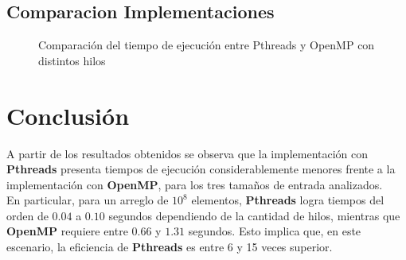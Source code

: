 \documentclass[12pt]{article}
\begin{document}
\subsection*{Comparacion Implementaciones}

\begin{figure}[H]
\centering
{}
\caption{Comparación del tiempo de ejecución entre Pthreads y OpenMP con distintos hilos}
\end{figure}

\section*{Conclusión}
A partir de los resultados obtenidos se observa que la implementación con \textbf{Pthreads} presenta tiempos de ejecución considerablemente menores frente a la implementación con \textbf{OpenMP}, para los tres tamaños de entrada analizados.\\

En particular, para un arreglo de $10^8$ elementos, \textbf{Pthreads} logra tiempos del orden de $0.04$ a $0.10$ segundos dependiendo de la cantidad de hilos, mientras que \textbf{OpenMP} requiere entre $0.66$ y $1.31$ segundos. Esto implica que, en este escenario, la eficiencia de \textbf{Pthreads} es entre 6 y 15 veces superior. \\
\end{document}
